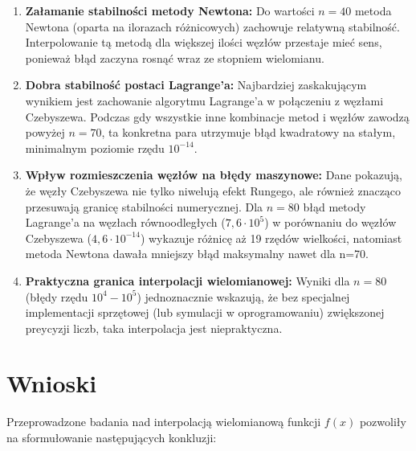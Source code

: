 \documentclass{article}
\begin{document}
\begin{enumerate}
    \item \textbf{Załamanie stabilności metody Newtona:} 
    Do wartości $n=40$ metoda Newtona (oparta na ilorazach różnicowych) zachowuje relatywną stabilność. Interpolowanie tą metodą dla większej ilości węzłów
    przestaje mieć sens, ponieważ błąd zaczyna rosnąć wraz ze stopniem wielomianu.

    \item \textbf{Dobra stabilność postaci Lagrange'a:}
    Najbardziej zaskakującym wynikiem jest zachowanie algorytmu Lagrange'a w połączeniu z węzłami Czebyszewa. Podczas gdy wszystkie inne kombinacje metod i
    węzłów zawodzą powyżej $n=70$, ta konkretna para utrzymuje błąd kwadratowy na stałym, minimalnym poziomie rzędu $10^{-14}$.

    \item \textbf{Wpływ rozmieszczenia węzłów na błędy maszynowe:}
    Dane pokazują, że węzły Czebyszewa nie tylko niwelują efekt Rungego, ale również znacząco przesuwają granicę stabilności numerycznej. Dla $n=80$ błąd
    metody Lagrange'a na węzłach równoodległych ($7,6 \cdot 10^5$) w porównaniu do węzłów Czebyszewa
    ($4,6 \cdot 10^{-14}$) wykazuje różnicę aż 19 rzędów wielkości, natomiast metoda Newtona dawała mniejszy błąd maksymalny nawet dla n=70.

    \item \textbf{Praktyczna granica interpolacji wielomianowej:}
    Wyniki dla $n=80$ (błędy rzędu $10^4 - 10^5$) jednoznacznie wskazują, że bez specjalnej implementacji sprzętowej (lub symulacji
    w oprogramowaniu) zwiększonej preycyzji liczb, taka interpolacja jest niepraktyczna.
\end{enumerate}

\section{Wnioski}

Przeprowadzone badania nad interpolacją wielomianową funkcji $f(x)$ pozwoliły na sformułowanie następujących konkluzji:
\end{document}
